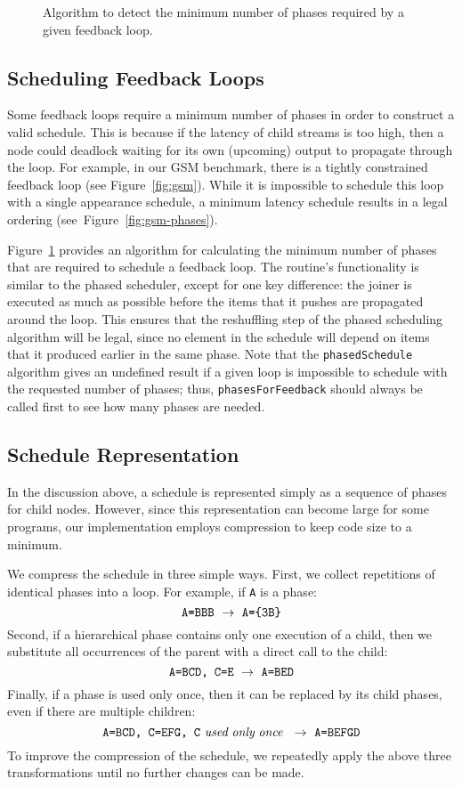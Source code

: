 \begin{figure}[t]
\vspace{-16pt}
\caption{\small Algorithm to detect the minimum number of phases required by
a given feedback loop.\protect\label{fig:feedalg}}
\end{figure}

\subsection{Scheduling Feedback Loops}

Some feedback loops require a minimum number of phases in order to
construct a valid schedule.  This is because if the latency of child
streams is too high, then a node could deadlock waiting for its own
(upcoming) output to propagate through the loop.  For example, in our
GSM benchmark, there is a tightly constrained feedback loop (see
Figure~\ref{fig:gsm}).  While it is impossible to schedule this loop
with a single appearance schedule, a minimum latency schedule results
in a legal ordering (see~Figure~\ref{fig:gsm-phases}).

Figure~\ref{fig:feedalg} provides an algorithm for calculating the
minimum number of phases that are required to schedule a feedback
loop.  The routine's functionality is similar to the phased scheduler,
except for one key difference: the joiner is executed as much as
possible before the items that it pushes are propagated around the
loop.  This ensures that the reshuffling step of the phased scheduling
algorithm will be legal, since no element in the schedule will depend
on items that it produced earlier in the same phase.  Note that the
{\tt phasedSchedule} algorithm gives an undefined result if a given
loop is impossible to schedule with the requested number of phases;
thus, {\tt phasesForFeedback} should always be called first to see how
many phases are needed.

\subsection{Schedule Representation}
\label{sec:schedrep}

In the discussion above, a schedule is represented simply as a
sequence of phases for child nodes.  However, since this
representation can become large for some programs, our implementation
employs compression to keep code size to a minimum.  

We compress the schedule in three simple ways.  First, we collect
repetitions of identical phases into a loop.  For example, if {\tt A}
is a phase:
\[
\mbox{{\tt A=BBB}} ~\rightarrow~ \mbox{{\tt A=\{3B\}}}
\]
Second, if a hierarchical phase contains only one execution of a
child, then we substitute all occurrences of the parent with a direct
call to the child:
\[
\mbox{{\tt A=BCD, C=E}} ~\rightarrow~ \mbox{{\tt A=BED}}
\]
Finally, if a phase is used only once, then it can be replaced by its
child phases, even if there are multiple children:
\[
\mbox{{\tt A=BCD, C=EFG, C}}~\mbox{\it used}~\mbox{\it only}~\mbox{\it once}~ ~\rightarrow~ \mbox{{\tt A=BEFGD}}
\]
To improve the compression of the schedule, we repeatedly apply the
above three transformations until no further changes can be made.

